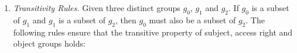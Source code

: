 \documentclass[11pt]{report}
\newenvironment{vquote}
{
  \begin{list}{}{\leftmargin 1em}\item[]
}
{
  \end{list}
}
\begin{document}
\begin{enumerate}

              \item
                {\em Transitivity Rules.}
                Given three distinct groups $g_0$, $g_1$ and $g_2$. If $g_0$ is
                a subset of $g_1$ and $g_1$ is a subset of $g_2$, then $g_0$
                must also be a subset of $g_2$. The following rules ensure that
                the transitive property of subject, access right and object
                groups holds:

\end{enumerate}
\end{document}
